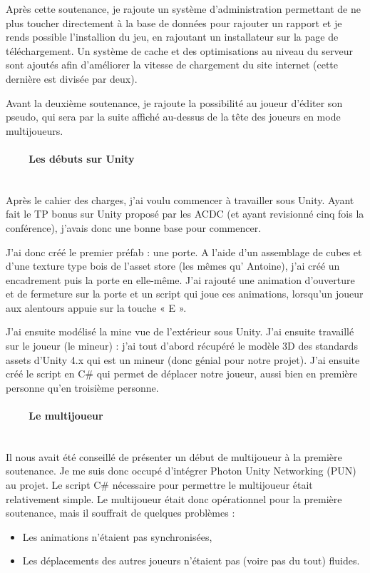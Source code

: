 \documentclass[titlepage, 13px, a4paper]{report}
\begin{document}
Après cette soutenance, je rajoute un système d’administration permettant de ne plus toucher directement 
à la base de données pour rajouter un rapport et je rends possible l’installion du jeu, en rajoutant un 
installateur sur la page de téléchargement. Un système de cache et des optimisations au niveau du serveur 
sont ajoutés afin d’améliorer la vitesse de chargement du site internet (cette dernière est divisée par deux).

Avant la deuxième soutenance, je rajoute la possibilité au joueur d’éditer son pseudo, qui sera par la suite affiché 
au-dessus de la tête des joueurs en mode multijoueurs. \\


\paragraph{~~~~Les débuts sur Unity} \hspace{0pt}     \\
Après le cahier des charges, j’ai voulu commencer à travailler sous Unity. Ayant fait le TP bonus sur 
Unity proposé par les ACDC (et ayant revisionné cinq fois la conférence), j’avais donc une bonne base pour commencer.

J’ai donc créé le premier préfab : une porte.
A l’aide d’un assemblage de cubes et d’une texture type bois de l’asset store (les mêmes qu' Antoine), 
j’ai créé un encadrement puis la porte en elle-même. J’ai rajouté une animation d’ouverture et de fermeture 
sur la porte et un script qui joue ces animations, lorsqu’un joueur aux alentours appuie sur la touche « E ».

J’ai ensuite modélisé la mine vue de l’extérieur sous Unity.
J’ai ensuite travaillé sur le joueur (le mineur) : j’ai tout d’abord récupéré le modèle 3D des standards assets d’Unity 4.x 
qui est un mineur (donc génial pour notre projet). J’ai ensuite créé le script en C\# qui permet de déplacer 
notre joueur, aussi bien en première personne qu’en troisième personne. \\


\paragraph{~~~~Le multijoueur} \hspace{0pt} \\
Il nous avait été conseillé de présenter un début de multijoueur à la première soutenance. 
Je me suis donc occupé d’intégrer Photon Unity Networking (PUN) au projet.
Le script C\# nécessaire pour permettre le multijoueur était relativement simple.
Le multijoueur était donc opérationnel pour la première soutenance, mais il souffrait de quelques problèmes : \\
{\begin{itemize}
	 \item Les animations n’étaient pas synchronisées,
	 \item Les déplacements des autres joueurs n’étaient pas (voire pas du tout) fluides. \\
\end{itemize}}
\end{document}
